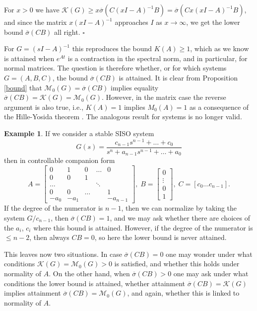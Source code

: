 \documentclass[12pt, a4paper,reqno]{amsart}
\renewenvironment{proof}{\noindent {\bf Proof: }}{\rm\\}
\theoremstyle{definition}
\newtheorem{example}{Example}{\rm}
\begin{document}
\begin{proof}
For $x > 0$ we have
$\mathcal K(G) \geq x \overline{\sigma} (C(xI-A)^{-1} B) = \overline{\sigma}(C x(xI-A)^{-1}B)$, and since the matrix $x(xI-A)^{-1}$ approaches $I$ as $x \to \infty$,
we get the lower bound $\overline{\sigma}(CB)$ all right. 
\hfill $\square$
\end{proof}



For  $G=(sI-A)^{-1}$ this reproduces the bound $K(A)\geq 1$, which as we know is attained when $e^{At}$ is
a contraction in the spectral norm, and in particular, for normal matrices.  The question is therefore
whether, or for which systems $G=(A,B,C)$, the bound $\overline{\sigma}(CB)$  is attained. 
It is clear from Proposition \ref{bound} that $\mathcal M_0(G)=\overline{\sigma}(CB)$
implies equality $\overline{\sigma}(CB)=\mathcal K(G)=\mathcal M_0(G)$. However, in the matrix case
the reverse argument is also true, i.e., $K(A)=1$ implies $M_0(A)=1$ as a consequence of the Hille-Yosida theorem \cite{engel2000one}.
The analogous result for systems is no longer valid.

\begin{example} %
If we consider a stable SISO system
$$
G(s) = \frac{c_{n-1} s^{n-1} +\dots + c_0}{s^n + a_{n-1} s^{n-1} + \dots + a_0}
$$
then in controllable companion form
$$
A= \begin{bmatrix} 0 & 1 & 0& \dots& 0\\
0 & 0 & 1 & &\\
\dots & && \ddots &\\
0 & 0 & \dots & &1 \\
-a_0&-a_1& &&-a_{n-1} \end{bmatrix},\;
B = \begin{bmatrix} 0 \\ \vdots \\ 0 \\ 1\end{bmatrix},\;
C = [c_0 \dots c_{n-1}].
$$
If the degree of the numerator is $n-1$, then we can
normalize by taking the system $G/c_{n-1}$, then $\overline{\sigma}(CB)=1$, and we may ask whether there are choices of 
the $a_i$, $c_i$ where this bound is attained. However, if the degree
of the numerator is $\leq n-2$, then always $CB=0$, so here the lower bound is never attained. 
\end{example}

This leaves now two situations. In case $\overline{\sigma}(CB)=0$ one may wonder
under what conditions $\mathcal K(G)=\mathcal M_0(G) >0$ is satisfied, and whether this holds under normality of $A$. On the other
hand, when $\overline{\sigma}(CB) > 0$ one may ask under what conditions the lower bound is attained,
whether attainment  $\overline{\sigma}(CB)=\mathcal K(G)$ implies attainment $\overline{\sigma}(CB)=\mathcal M_0(G)$, and again, whether this is linked to normality of $A$. 
\end{document}
